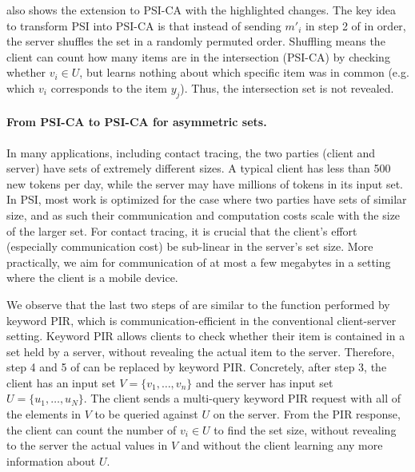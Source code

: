  also shows the extension to PSI-CA with the highlighted changes. The key idea to transform PSI into PSI-CA is that instead of sending $m'_i$ in step 2 of  in order, the server shuffles the set in a randomly permuted order.  Shuffling means the client can count how many items are in the intersection (PSI-CA) by checking whether  $v_i \in U$, but learns nothing about which specific item was in common (e.g. which $v_i$ corresponds to the item $y_j$). Thus, the intersection set is not revealed.

\paragraph{From PSI-CA to PSI-CA for asymmetric sets.}

In many applications, including contact tracing, the two parties (client and server) have sets of extremely different sizes. A typical client has less than 500 new tokens per day, while the server may
have millions of tokens in its input set. In PSI, most work is optimized for the case where two parties have sets of similar size, and as such their communication and computation costs scale with the size of the larger set. For contact tracing, it is crucial that the client's effort (especially communication cost) be sub-linear in the server's set size. More practically, we aim for communication of at most a few megabytes in a setting where the client is a mobile device. 

We observe that the last two steps of  are similar to the function performed by keyword PIR, which is communication-efficient in the conventional client-server setting. Keyword PIR allows clients to check whether their item is contained in a set held by a server, without revealing the actual item to the server. Therefore, step 4 and 5 of  can be replaced by keyword PIR. Concretely, after step 3, the client has an input set $V=\{v_1, \ldots, v_n\}$ and the server has input set $U=\{u_1, \ldots, u_N\}$. The client sends a multi-query keyword PIR request with all of the elements in $V$ to be queried against $U$ on the server. From the PIR response, the client can count the number of $v_i \in U$ to find the set size, without revealing to the server the actual values in $V$ and without the client learning any more information about $U$.

